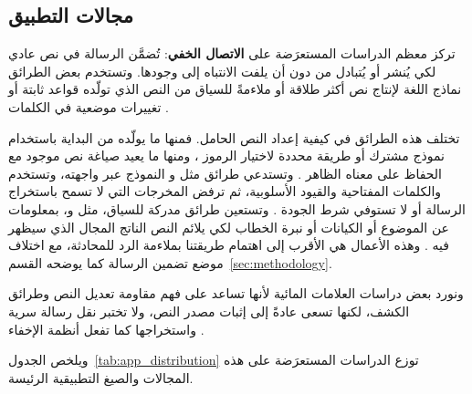 \subsection{مجالات التطبيق}
\label{sec:related-rq2}

تركز معظم الدراسات المستعرَضة على \textbf{الاتصال الخفي}: تُضمَّن الرسالة في نص عادي لكي يُنشر أو يُتبادل من دون أن يلفت الانتباه إلى وجودها. وتستخدم بعض الطرائق نماذج اللغة لإنتاج نص أكثر طلاقة أو ملاءمةً للسياق من النص الذي تولّده قواعد ثابتة أو تغييرات موضعية في الكلمات \cite{yang2020vae,kaptchuk2021meteor,wu2024generative}.

تختلف هذه الطرائق في كيفية إعداد النص الحامل. فمنها ما يولّده من البداية باستخدام نموذج مشترك أو طريقة محددة لاختيار الرموز \cite{ding2023discop,kaptchuk2021meteor}، ومنها ما يعيد صياغة نص موجود مع الحفاظ على معناه الظاهر \cite{li2023rewriting}. وتستدعي طرائق مثل  و النموذج عبر واجهته، وتستخدم  والكلمات المفتاحية والقيود الأسلوبية، ثم ترفض المخرجات التي لا تسمح باستخراج الرسالة أو لا تستوفي شرط الجودة \cite{wu2024generative,kuznetsov2025deepstego,wozniak2025multicriteria}. وتستعين طرائق مدركة للسياق، مثل  و، بمعلومات عن الموضوع أو الكيانات أو نبرة الخطاب لكي يلائم النص الناتج المجال الذي سيظهر فيه \cite{liao2024co,wang2023hi,shi2025emotionally}. وهذه الأعمال هي الأقرب إلى اهتمام طريقتنا بملاءمة الرد للمحادثة، مع اختلاف موضع تضمين الرسالة كما يوضحه القسم~\ref{sec:methodology}.

ونورد بعض دراسات العلامات المائية لأنها تساعد على فهم مقاومة تعديل النص وطرائق الكشف، لكنها تسعى عادةً إلى إثبات مصدر النص، ولا تختبر نقل رسالة سرية واستخراجها كما تفعل أنظمة الإخفاء \cite{wang2025contrastive}.

ويلخص الجدول~\ref{tab:app_distribution} توزع الدراسات المستعرَضة على هذه المجالات والصيغ التطبيقية الرئيسة.

